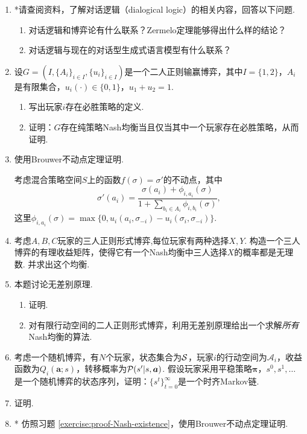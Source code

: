 \begin{enumerate}[wide, labelindent=0pt]
    \item *请查阅资料，了解对话逻辑（dialogical logic）的相关内容，回答以下问题. 
    \begin{enumerate}
        \item 对话逻辑和博弈论有什么联系？Zermelo定理能够得出什么样的结论？
        \item 对话逻辑与现在的对话型生成式语言模型有什么联系？
    \end{enumerate}
    
    \item \label{exercise:zero-sum-pure-NE} 设$G=(I,\{A_i\}_{i\in I}, \{u_i\}_{i\in I})$是一个二人正则输赢博弈，其中$I=\{1,2\}$，$A_i$是有限集合，$u_i(\cdot)\in\{0,1\}$，$u_1+u_2=1$.
    \begin{enumerate}
        \item 写出玩家$i$存在必胜策略的定义.
        \item 证明：$G$存在纯策略Nash均衡当且仅当其中一个玩家存在必胜策略，从而证明.
    \end{enumerate}

    \item \label{exercise:proof-Nash-existence} 使用Brouwer不动点定理证明.
        \begin{hint}
        考虑混合策略空间$S$上的函数$f(\sigma) = \sigma'$的不动点，其中
        \[\sigma'(a_i) = \frac{\sigma(a_i) + \phi_{i,a_i}(\sigma)}{1+\sum_{b_i\in A_i}\phi_{i,b_i}(\sigma)},\]
        这里$\phi_{i,a_i}(\sigma)=\max\{0, u_i(a_i,\sigma_{-i})-u_i(\sigma_i,\sigma_{-i})\}$. 
        \end{hint}
    
    \item 考虑$A,B,C$玩家的三人正则形式博弈,每位玩家有两种选择$X,Y$. 构造一个三人博弈的有理收益矩阵，使得它有一个Nash均衡中三人选择$X$的概率都是无理数. 并求出这个均衡.

    \item \label{exercise:indifference-principle} 本题讨论无差别原理. 
    \begin{enumerate}
        \item 证明.
        \item 对有限行动空间的二人正则形式博弈，利用无差别原理给出一个求解\textit{所有}Nash均衡的算法. 
    \end{enumerate}

    \item \label{exercise:state-sequence-Markov} 考虑一个随机博弈，有$N$个玩家，状态集合为$\mathcal S$，玩家$i$的行动空间为$\mathcal A_i$，收益函数为$Q_i(\boldsymbol a;s)$，转移概率为$\mathcal P(s'|s,\boldsymbol a)$. 假设玩家采用平稳策略$\boldsymbol \pi$，$s^0,s^1,\dots$是一个随机博弈的状态序列，证明：$\{s^t\}_{t=0}^{\infty}$是一个时齐Markov链. 
    
    \item \label{exercise:stochastic-game-bellman} 证明.
    
    \item *\label{exercise:proof-MPE-existence} 仿照习题 \ref{exercise:proof-Nash-existence}，使用Brouwer不动点定理证明.
\end{enumerate}